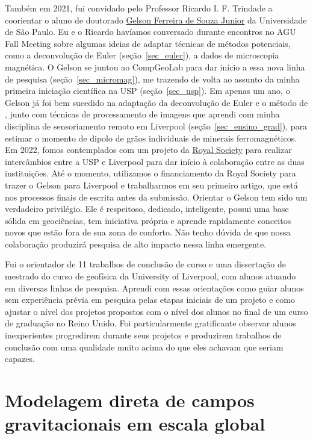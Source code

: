 \documentclass[10pt,a4paper,oneside]{book}
\begin{document}
Também em 2021, fui convidado pelo Professor Ricardo I. F. Trindade a
coorientar o aluno de doutorado
\href{https://www.compgeolab.org/team/#Souza-junior}{Gelson Ferreira de Souza Junior}
da Universidade de São Paulo.
Eu e o Ricardo havíamos conversado durante encontros no AGU Fall Meeting sobre
algumas ideias de adaptar técnicas de métodos potenciais, como a deconvolução
de Euler (seção~\ref{sec_euler}), a dados de microscopia magnética.
O Gelson se juntou ao CompGeoLab para dar início a essa nova linha de pesquisa
(seção~\ref{sec_micromag}), me trazendo de volta ao assunto da minha primeira
iniciação científica na USP (seção~\ref{sec_usp}).
Em apenas um ano, o Gelson já foi bem sucedido na adaptação da deconvolução de
Euler e o método de \citet{OliveiraJr2015}, junto com técnicas de processamento
de imagens que aprendi com minha disciplina de sensoriamento remoto em
Liverpool (seção~\ref{sec_ensino_grad}), para estimar o momento de dipolo
de grãos individuais de minerais ferromagnéticos.
Em 2022, fomos contemplados com um projeto da
\href{https://royalsociety.org/}{Royal Society} para realizar intercâmbios
entre a USP e Liverpool para dar início à colaboração entre as duas
instituições.
Até o momento, utilizamos o financiamento da Royal Society para trazer o Gelson
para Liverpool e trabalharmos em seu primeiro artigo, que está nos processos
finais de escrita antes da submissão.
Orientar o Gelson tem sido um verdadeiro privilégio.
Ele é respeitoso, dedicado, inteligente, possui uma base sólida em geociências,
tem iniciativa própria e aprende rapidamente conceitos novos que estão fora de
sua zona de conforto.
Não tenho dúvida de que nossa colaboração produzirá pesquisa de alto impacto
nessa linha emergente.

Fui o orientador de 11 trabalhos de conclusão de curso e uma dissertação de
mestrado do curso de geofísica da University of Liverpool, com alunos
atuando em diversas linhas de pesquisa.
Aprendi com essas orientações como guiar alunos sem experiência prévia em
pesquisa pelas etapas iniciais de um projeto e como ajustar o nível dos
projetos propostos com o nível dos alunos no final de um curso de graduação no
Reino Unido.
Foi particularmente gratificante observar alunos inexperientes progredirem
durante seus projetos e produzirem trabalhos de conclusão com uma qualidade
muito acima do que eles achavam que seriam capazes.

\section{Modelagem direta de campos gravitacionais em escala global}
\label{sec_modelagemdireta}
\end{document}
